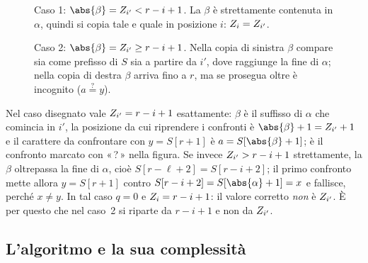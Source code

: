 \begin{figure}[H]
  \centering
  
  \caption{Caso 1: $\abs{\beta}=\Zv{i'}<r-i+1$. La \Zbox $\beta$ è strettamente
  contenuta in $\alpha$, quindi si copia tale e quale in posizione $i$:
  $Z_{i}=Z_{i'}$.}
  \label{fig:z-caso1}
\end{figure}

\begin{figure}[H]
  \centering
  
  \caption{Caso 2: $\abs{\beta}=\Zv{i'}\ge r-i+1$. Nella copia di sinistra
  $\beta$ compare sia come prefisso di $S$ sia a partire da $i'$, dove raggiunge
  la fine di $\alpha$; nella copia di destra $\beta$ arriva fino a $r$, ma se
  prosegua oltre è incognito ($a\overset{?}{=}y$).}
  \label{fig:z-caso2}
\end{figure}

\begin{osservazione}
  Nel caso disegnato vale $Z_{i'}=r-i+1$ esattamente: $\beta$ è il suffisso di
  $\alpha$ che comincia in $i'$, la posizione da cui riprendere i confronti è
  $\abs{\beta}+1=\Zv{i'}+1$ e il carattere da confrontare con $y=S[r+1]$ è
  $a=S[\abs{\beta}+1]$; è il confronto marcato con «\,?\,» nella figura. Se
  invece $Z_{i'}>r-i+1$ strettamente, la \Zbox $\beta$ oltrepassa la fine di
  $\alpha$, cioè $S[r-\ell+2]=S[r-i+2]$; il primo confronto mette allora
  $y=S[r+1]$ contro $S[r-i+2]=S[\abs{\alpha}+1]=x$ e fallisce, perché $x\neq y$.
  In tal caso $q=0$ e $Z_{i}=r-i+1$: il valore corretto \emph{non} è $Z_{i'}$.
  È per questo che nel caso~2 si riparte da $r-i+1$ e non da $Z_{i'}$.
\end{osservazione}

\subsection{L'algoritmo e la sua complessità}
\label{sec:z-complessita}

